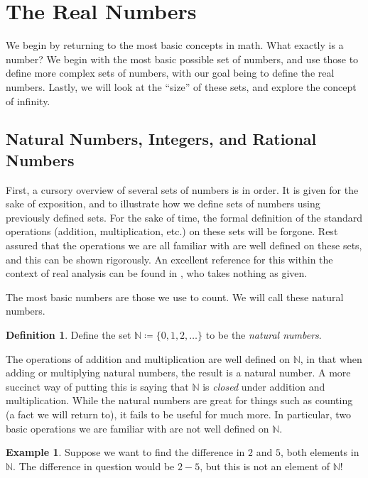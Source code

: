 \documentclass{article}
\newcommand{\N}{\mathbb{N}}
\theoremstyle{definition}
\newtheorem{definition}{Definition}[section]
\newtheorem{example}{Example}[section]
\begin{document}
	\section{The Real Numbers}
	We begin by returning to the most basic concepts in math. What exactly is a number? We begin with the most basic possible set of numbers, and use those to define more complex sets of numbers, with our goal being to define the real numbers. Lastly, we will look at the ``size'' of these sets, and explore the concept of infinity. 
	\subsection{Natural Numbers, Integers, and Rational Numbers}
	First, a cursory overview of several sets of numbers is in order. It is given for the sake of exposition, and to illustrate how we define sets of numbers using previously defined sets. For the sake of time, the formal definition of the standard operations (addition, multiplication, etc.) on these sets will be forgone. Rest assured that the operations we are all familiar with are well defined on these sets, and this can be shown rigorously. An excellent reference for this within the context of real analysis can be found in \cite{tao2006analysis}, who takes nothing as given. 
	
	The most basic numbers are those we use to count. We will call these natural numbers. \begin{definition}
		Define the set $ \N\coloneqq\{0,1,2,\ldots\} $ to be the \textit{{\color{red} natural numbers}}. 
	\end{definition}
	\noindent The operations of addition and multiplication are well defined on $ \N $, in that when adding or multiplying natural numbers, the result is a natural number. A more succinct way of putting this is saying that $ \N $ is \textit{closed} under addition and multiplication. While the natural numbers are great for things such as counting (a fact we will return to), it fails to be useful for much more. In particular, two basic operations we are familiar with are not well defined on $ \N $.
	\begin{example}
		Suppose we want to find the difference in $ 2 $ and $ 5 $, both elements in $ \N $. The difference in question would be $ 2-5 $, but this is not an element of $ \N $! 
	\end{example}
	
\end{document}
